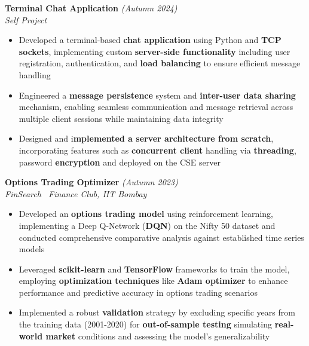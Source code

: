 \documentclass[11pt,letterpaper,sans]{moderncv}
\begin{document}
\vspace{\projectspacing}
\noindent \textbf{\large Terminal Chat Application} \hfill{\sl \small (Autumn 2024)}\\
{\it Self Project } \hfill{\sl }\\
\vspace{-\spacinghue}
\begin{itemize}[noitemsep, topsep=0pt, leftmargin=*]
\setlength\itemsep{\subpointspacing}
\item Developed a terminal-based \textbf{ chat application} using Python and \textbf{TCP sockets}, implementing custom \textbf{server-side functionality} including user registration, authentication, and \textbf{load balancing} to ensure efficient message handling
\item Engineered a \textbf{message persistence} system and \textbf{inter-user data sharing} mechanism, enabling seamless communication and message retrieval across multiple client sessions while maintaining data integrity
\item Designed and i\textbf{mplemented a server architecture from scratch}, incorporating features such as \textbf{concurrent client} handling via \textbf{threading}, password \textbf{encryption} and deployed on the CSE server
\end{itemize}

\vspace{\projectspacing}

\noindent \textbf{\large Options Trading Optimizer} \hfill{\sl \small (Autumn 2023)}\\
{\it FinSearch \textbar \ Finance Club, IIT Bombay}\\
\vspace{-\spacinghue}
\begin{itemize}[noitemsep, topsep=0pt, leftmargin=*]
\setlength\itemsep{\subpointspacing}
\item Developed an \textbf{options trading model} using reinforcement learning, implementing a Deep Q-Network (\textbf{DQN}) on the Nifty 50 dataset and conducted comprehensive comparative analysis against established time series models
\item Leveraged \textbf{scikit-learn} and \textbf{TensorFlow} frameworks to train the model, employing \textbf{optimization techniques} like \textbf{Adam optimizer} to enhance performance and predictive accuracy in options trading scenarios
\item Implemented a robust \textbf{validation} strategy by excluding specific years from the training data (2001-2020) for \textbf{out-of-sample testing} simulating \textbf{real-world market} conditions and assessing the model's generalizability
\end{itemize}
\end{document}
